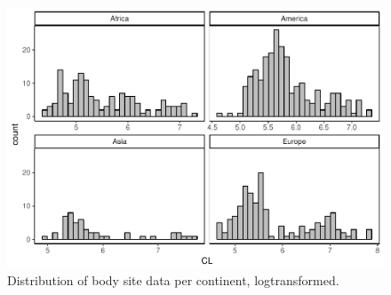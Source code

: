\documentclass[]{article}
\begin{document}
\begin{figure}[htbp]
\centering
\includegraphics{MA_JJ_files/figure-latex/Histograms of body size data, split by continents-1.pdf}
\caption{Distribution of body site data per continent, logtransformed.}
\end{figure}

\newpage
\end{document}
